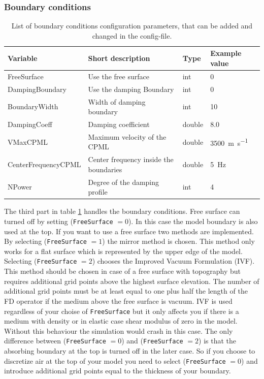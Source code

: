 \documentclass[pdftex,a4paper,parskip,listof=totoc,bibliography=totoc,onehalfspacing,12pt]{scrreprt}
\begin{document}
\subsubsection{Boundary conditions}
\begin{table}[h!]
\caption[List of boundary conditions configuration parameters.]{List of boundary conditions configuration parameters, that can be added and changed in the config-file.}\label{tab:config_boundary}
\centering
\begin{adjustbox}{width=1\textwidth,center=\textwidth}
	\begin{tabular}{llll}
	\toprule
	Variable & Short description & Type & Example value \\
	\midrule
	FreeSurface& Use the free surface & int & \num{0}\\
	DampingBoundary& Use the damping Boundary & int & \num{0}\\
	BoundaryWidth& Width of damping boundary & int & \num{10}\\
	DampingCoeff& Damping coefficient & double & \num{8.0}\\
	VMaxCPML& Maximum velocity of the CPML & double &\SI{3500}{m\per s}\\
	CenterFrequencyCPML\;\;\;\;& Center frequency inside the boundaries\;\;\;  & double &\SI{5}{Hz}\\
	NPower& Degree of the damping profile & int &\num{4}\\
	\bottomrule
	\end{tabular}
	\end{adjustbox}
\end{table}
The third part in table \ref{tab:config_boundary} handles the boundary conditions. Free surface can turned off by setting (\verb+FreeSurface+ $=0$). In this case the model boundary is also used at the top. If you want to use a free surface two methods are implemented. By selecting (\verb+FreeSurface+ $=1$) the mirror method is chosen. This method only works for a flat surface which is represented by the upper edge of the model. Selecting (\verb+FreeSurface+ $=2$) chooses the Improved Vacuum Formulation (IVF). This method should be chosen in case of a free surface with topography but requires additional grid points above the highest surface elevation. The number of additional grid points must be at least equal to one plus half the length of the FD operator if the medium above the free surface is vacuum. IVF is used regardless of your choise of \verb+FreeSurface+ but it only affects you if there is a medium with density or in elastic case shear modulus of zero in the model. Without this behaviour the simulation would crash in this case. The only difference between (\verb+FreeSurface+ $=0$) and (\verb+FreeSurface+ $=2$) is that the absorbing boundary at the top is turned off in the later case. So if you choose to discretize air at the top of your model you need to select (\verb+FreeSurface+ $=0$) and introduce additional grid points equal to the thickness of your boundary. 
\end{document}
